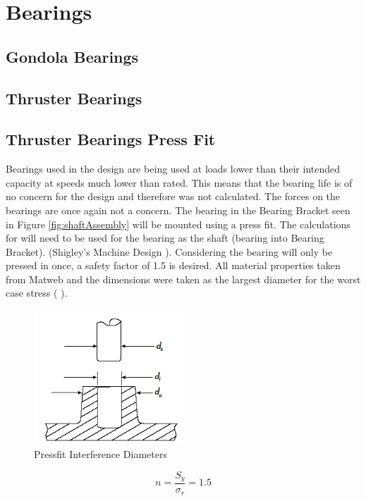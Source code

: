 \documentclass[../main.tex]{subfiles}
\begin{document}
\section{Bearings} \label{Bearings}
\subsection{Gondola Bearings}

\subsection{Thruster Bearings}
\subsection{Thruster Bearings Press Fit}
Bearings used in the design are being used at loads lower than their intended capacity at speeds much lower than rated. This means that the bearing life is of no concern for the design and therefore was not calculated. The forces on the bearings are once again not a concern. The bearing in the Bearing Bracket seen in Figure \ref{fig:shaftAssembly} will be mounted using a press fit. The calculations for will need to be used for the bearing as the shaft (bearing into Bearing Bracket). {(Shigley's Machine Design \cite[116]{shigley})}. Considering the bearing will only be pressed in once, a safety factor of 1.5 is desired. All material properties taken from Matweb and the dimensions were taken as the largest diameter for the worst case stress (\cite{316StainlessSteel} \cite{Aluminum6061} \cite{Nylon6}).

\begin{figure}[H]
	\centering
	\includegraphics[width=0.5\textwidth]{img/analysis/thruster/pressfit.png}
	\caption{Pressfit Interference Diameters \cite{pressfit}}
	\label{fig:pressfit}
\end{figure}

\begin{equation}
n=\frac{S_y}{\sigma_r}=1.5
\end{equation}
\end{document}
